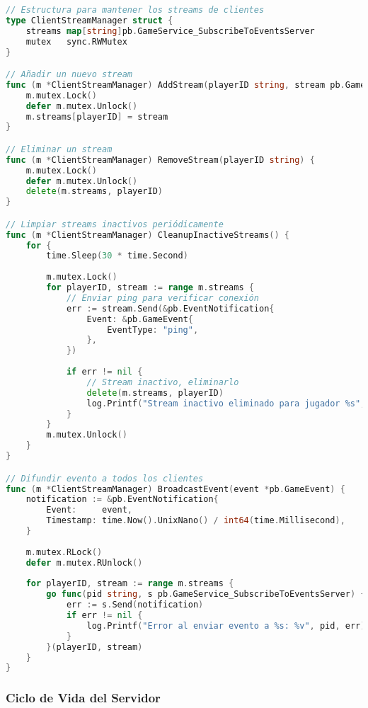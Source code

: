 \documentclass[12pt,letterpaper]{article}
\begin{document}
\begin{lstlisting}[language=go, caption=Gestión de streams de clientes]
// Estructura para mantener los streams de clientes
type ClientStreamManager struct {
    streams map[string]pb.GameService_SubscribeToEventsServer
    mutex   sync.RWMutex
}

// Añadir un nuevo stream
func (m *ClientStreamManager) AddStream(playerID string, stream pb.GameService_SubscribeToEventsServer) {
    m.mutex.Lock()
    defer m.mutex.Unlock()
    m.streams[playerID] = stream
}

// Eliminar un stream
func (m *ClientStreamManager) RemoveStream(playerID string) {
    m.mutex.Lock()
    defer m.mutex.Unlock()
    delete(m.streams, playerID)
}

// Limpiar streams inactivos periódicamente
func (m *ClientStreamManager) CleanupInactiveStreams() {
    for {
        time.Sleep(30 * time.Second)
        
        m.mutex.Lock()
        for playerID, stream := range m.streams {
            // Enviar ping para verificar conexión
            err := stream.Send(&pb.EventNotification{
                Event: &pb.GameEvent{
                    EventType: "ping",
                },
            })
            
            if err != nil {
                // Stream inactivo, eliminarlo
                delete(m.streams, playerID)
                log.Printf("Stream inactivo eliminado para jugador %s", playerID)
            }
        }
        m.mutex.Unlock()
    }
}

// Difundir evento a todos los clientes
func (m *ClientStreamManager) BroadcastEvent(event *pb.GameEvent) {
    notification := &pb.EventNotification{
        Event:     event,
        Timestamp: time.Now().UnixNano() / int64(time.Millisecond),
    }
    
    m.mutex.RLock()
    defer m.mutex.RUnlock()
    
    for playerID, stream := range m.streams {
        go func(pid string, s pb.GameService_SubscribeToEventsServer) {
            err := s.Send(notification)
            if err != nil {
                log.Printf("Error al enviar evento a %s: %v", pid, err)
            }
        }(playerID, stream)
    }
}
\end{lstlisting}

\subsubsection{Ciclo de Vida del Servidor}
\end{document}
